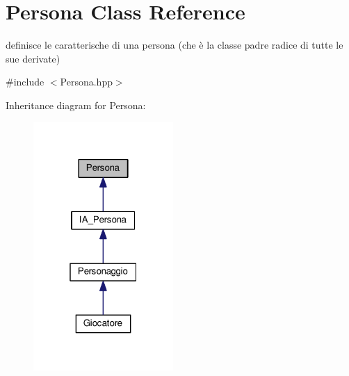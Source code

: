 \hypertarget{classPersona}{}\section{Persona Class Reference}
\label{classPersona}


definisce le caratterische di una persona (che è la classe padre radice di tutte le sue derivate)  




{\ttfamily \#include $<$Persona.\+hpp$>$}



Inheritance diagram for Persona\+:\nopagebreak
\begin{figure}[H]
\begin{center}
\leavevmode
\includegraphics[width=151pt]{classPersona__inherit__graph}
\end{center}
\end{figure}
